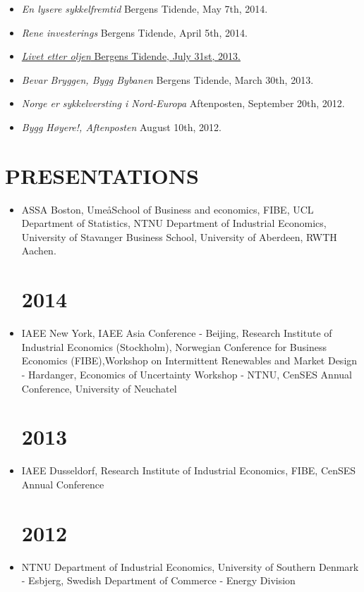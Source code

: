 \documentclass[margin]{res}
\begin{document}
\begin{resume}
\begin{itemize}
\item[] \emph {En lysere sykkelfremtid}  Bergens Tidende, May 7th, 2014.
\item[] \emph {Rene investerings}  Bergens Tidende, April 5th, 2014.
\item[] \href{http://www.nhh.no/Files/Filer/institutter/for/bedriftsøkonomisk_debatt/2013/mauritzen-livet_etter_oljen-bt-310713.pdf}{\emph {Livet etter oljen}  Bergens Tidende, July 31st, 2013.}
\item[] \emph {Bevar Bryggen, Bygg Bybanen}  Bergens Tidende, March 30th, 2013.
\item[] \emph {Norge er sykkelversting i Nord-Europa} Aftenposten, September 20th, 2012.
\item[] \emph {Bygg H\o yere!, Aftenposten} August 10th, 2012.
\end{itemize}

\section{PRESENTATIONS}      
 
\begin{itemize}
\normalsize{\section{2015}} 
\item[] ASSA Boston, Ume\aa School of Business and economics, FIBE, UCL Department of Statistics, NTNU Department of Industrial Economics, University of Stavanger Business School, University of Aberdeen, RWTH Aachen.
\normalsize{\section{2014}} 
\item[] IAEE New York, IAEE Asia Conference - Beijing, Research Institute of Industrial Economics (Stockholm), Norwegian Conference for Business Economics (FIBE),Workshop on Intermittent Renewables and Market Design - Hardanger, Economics of Uncertainty Workshop - NTNU, CenSES Annual Conference, University of Neuchatel  
\normalsize{\section{2013}}
\item[] IAEE Dusseldorf, Research Institute of Industrial Economics, FIBE, CenSES Annual Conference 
\normalsize{\section{2012}}
\item[] NTNU Department of Industrial Economics, University of Southern Denmark - Esbjerg, Swedish Department of Commerce - Energy Division
\end{itemize}


\end{resume}
\end{document}

